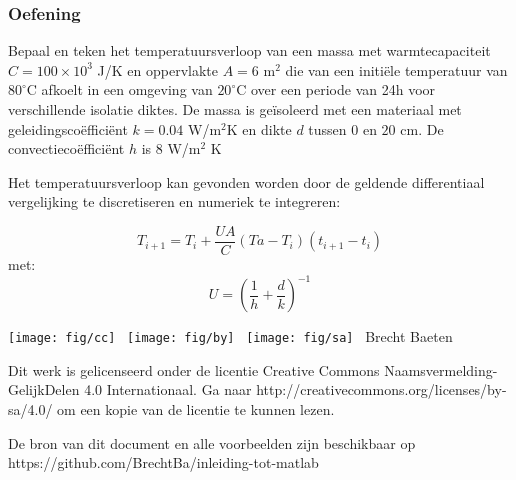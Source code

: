 \documentclass[t]{beamer}
\begin{document}
\begin{frame}
	\frametitle{Oefening}
Bepaal en teken het temperatuursverloop van een massa met warmtecapaciteit $C=100 \times 10^3$ J/K en oppervlakte $A = 6$ m$^2$ die van een initiële temperatuur van $80^\circ$C afkoelt in een omgeving van $20^\circ$C over een periode van 24h voor verschillende isolatie diktes. De massa is geïsoleerd met een materiaal met geleidingscoëfficiënt $k = 0.04$ W/m$^2$K en dikte $d$ tussen $0$ en $20$ cm. De convectiecoëfficiënt $h$ is $8$ W/m$^2$ K

	\vspace{0.5cm}
Het temperatuursverloop kan gevonden worden door de geldende differentiaal vergelijking te discretiseren en numeriek te integreren:

	\begin{equation}
		T_{i+1} = T_{i} + \frac{U A}{C} (Ta-T_{i}) (t_{i+1}-t_{i})
	\end{equation}	
met:
	\begin{equation}
		U = \left(\frac{1}{h} + \frac{d}{k} \right)^{-1}
	\end{equation}
\end{frame}
\begin{frame}
	\footnotesize
	\vspace{4cm}
	\texttt{[image: fig/cc]} \
	\texttt{[image: fig/by]} \
	\texttt{[image: fig/sa]}
	\quad \the\year\ Brecht Baeten
	\vspace{0.5cm}
	
    Dit werk is gelicenseerd onder de licentie Creative Commons Naamsvermelding-GelijkDelen 4.0 Internationaal. Ga naar http://creativecommons.org/licenses/by-sa/4.0/ om een kopie van de licentie te kunnen lezen.
    	
    \vspace{0.5cm}
    De bron van dit document en alle voorbeelden zijn beschikbaar op https://github.com/BrechtBa/inleiding-tot-matlab
\end{frame}
\end{document}
